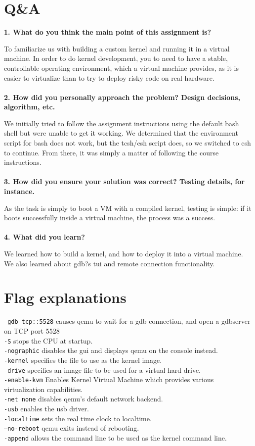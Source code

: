 \documentclass[10pt,a4paper]{report}
\begin{document}
	\newpage
	\section*{Q\&A}
	\textbf{1. What do you think the main point of this assignment is?}
	
		To familiarize us with building a custom kernel and running it in a virtual machine. In order to do kernel development, you to need to have a stable, controllable operating environment, which a virtual machine provides, as it is easier to virtualize than to try to deploy risky code on real hardware.
	\\
	\\
	\textbf{2. How did you personally approach the problem? Design decisions, algorithm, etc.}
	
		We initially tried to follow the assignment instructions using the default bash shell but were unable to get it working. We determined that the environment script for bash does not work, but the tcsh/csh script does, so we switched to csh to continue. From there, it was simply a matter of following the course instructions.
	\\
	\\
	\textbf{3. How did you ensure your solution was correct? Testing details, for instance.}
	
		As the task is simply to boot a VM with a compiled kernel, testing is simple: if it boots successfully inside a virtual machine, the process was a success.
	\\
	\\
	\textbf{4. What did you learn?}
	
		We learned how to build a kernel, and how to deploy it into a virtual machine. We also learned about gdb?s tui and remote connection functionality.
	
	
	\newpage
	\section*{Flag explanations}
	\texttt{-gdb tcp::5528} causes qemu to wait for a gdb connection, and open a gdbserver on TCP port 5528
	\\
	\texttt{-S} stops the CPU at startup.
	\\	
	\texttt{-nographic} disables the gui and displays qemu on the console instead.
	\\	
	\texttt{-kernel} specifies the file to use as the kernel image.
	\\	
	\texttt{-drive} specifies an image file to be used for a virtual hard drive.
	\\	
	\texttt{-enable-kvm} Enables Kernel Virtual Machine which provides various virtualization capabilities.
	\\	
	\texttt{-net none} disables qemu's default network backend.
	\\	
	\texttt{-usb} enables the usb driver.
	\\	
	\texttt{-localtime} sets the real time clock to localtime.
	\\	
	\texttt{--no-reboot} qemu exits instead of rebooting.
	\\	
	\texttt{-append} allows the command line to be used as the kernel command line.
	
\end{document}
